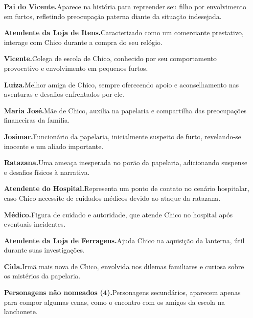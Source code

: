 \medskip\noindent \textbf{Pai do Vicente.}\quad Aparece na história para repreender seu filho por envolvimento em furtos, refletindo preocupação paterna diante da situação indesejada.

\medskip\noindent \textbf{Atendente da Loja de Itens.}\quad Caracterizado como um comerciante prestativo, interage com Chico durante a compra do seu relógio.

\medskip\noindent \textbf{Vicente.}\quad Colega de escola de Chico, conhecido por seu comportamento provocativo e envolvimento em pequenos furtos.

\medskip\noindent \textbf{Luiza.}\quad Melhor amiga de Chico, sempre oferecendo apoio e aconselhamento nas aventuras e desafios enfrentados por ele.

\medskip\noindent \textbf{Maria José.}\quad Mãe de Chico, auxilia na papelaria e compartilha das preocupações financeiras da família.

\medskip\noindent \textbf{Josimar.}\quad Funcionário da papelaria, inicialmente suspeito de furto, revelando-se inocente e um aliado importante.

\medskip\noindent \textbf{Ratazana.}\quad Uma ameaça inesperada no porão da papelaria, adicionando suspense e desafios físicos à narrativa.

\medskip\noindent \textbf{Atendente do Hospital.}\quad Representa um ponto de contato no cenário hospitalar, caso Chico necessite de cuidados médicos devido ao ataque da ratazana.

\medskip\noindent \textbf{Médico.}\quad Figura de cuidado e autoridade, que atende Chico no hospital após eventuais incidentes.

\medskip\noindent \textbf{Atendente da Loja de Ferragens.}\quad Ajuda Chico na aquisição da lanterna, útil durante suas investigações.

\medskip\noindent \textbf{Cida.}\quad Irmã mais nova de Chico, envolvida nos dilemas familiares e curiosa sobre os mistérios da papelaria.

\medskip\noindent \textbf{Personagens não nomeados (4).}\quad Personagens secundários, aparecem apenas para compor algumas cenas, como o encontro com os amigos da escola na lanchonete.

